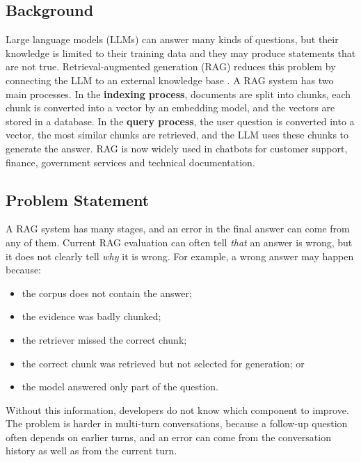 \documentclass[11pt]{article}
\begin{document}
\subsection{Background}
Large language models (LLMs) can answer many kinds of questions, but their knowledge is limited to their training data and they may produce statements that are not true. Retrieval-augmented generation (RAG) reduces this problem by connecting the LLM to an external knowledge base \citep{lewis2020rag}. A RAG system has two main processes. In the \textbf{indexing process}, documents are split into chunks, each chunk is converted into a vector by an embedding model, and the vectors are stored in a database. In the \textbf{query process}, the user question is converted into a vector, the most similar chunks are retrieved, and the LLM uses these chunks to generate the answer. RAG is now widely used in chatbots for customer support, finance, government services and technical documentation.

\subsection{Problem Statement}
A RAG system has many stages, and an error in the final answer can come from any of them. Current RAG evaluation can often tell \emph{that} an answer is wrong, but it does not clearly tell \emph{why} it is wrong. For example, a wrong answer may happen because:
\begin{itemize}
  \item the corpus does not contain the answer;
  \item the evidence was badly chunked;
  \item the retriever missed the correct chunk;
  \item the correct chunk was retrieved but not selected for generation; or
  \item the model answered only part of the question.
\end{itemize}
Without this information, developers do not know which component to improve. The problem is harder in multi-turn conversations, because a follow-up question often depends on earlier turns, and an error can come from the conversation history as well as from the current turn.
\end{document}
